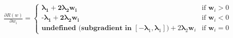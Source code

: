 \documentclass[preview]{standalone}
\begin{document}
\begin{align*}
\frac{\partial R(w)}{\partial w_i} =\begin{cases}\boldsymbol{\lambda}_\textbf{1} + \textbf{2}\boldsymbol{\lambda}_\textbf{2} \mathbf{w_i} & \text{if } \mathbf{w}_i > 0 \\\textbf{-}\boldsymbol{\lambda}_\textbf{1} + \textbf{2}\boldsymbol{\lambda}_\textbf{2} \mathbf{w_i} & \text{if } \mathbf{w}_i < 0 \\\textbf{undefined (subgradient in } [-\boldsymbol{\lambda}_1, \boldsymbol{\lambda}_1]\textbf{)} + 2\mathbf{\lambda}_2 \mathbf{w}_i & \text{if } \mathbf{w}_i = 0\end{cases}
\end{align*}
\end{document}
